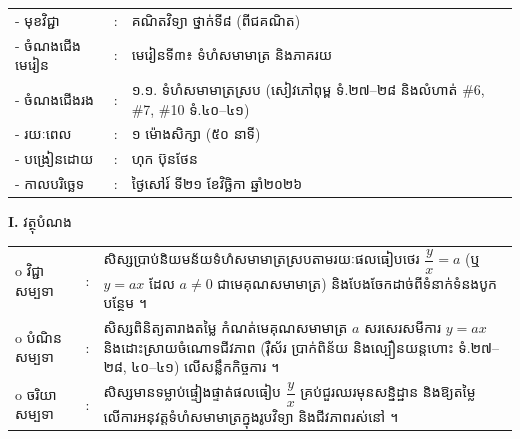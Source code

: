\documentclass[a4paper,10pt]{article}
\newcommand{\wcirc}{{\CourierBullet\fontsize{9.5pt}{11pt}\selectfont o}}
\begin{document}
{\renewcommand{\arraystretch}{0.98}
\hspace*{3.1cm}%
\begin{tabular}{@{}l l L{11.0cm}@{}}
  - \hspace{0.35cm} មុខវិជ្ជា & : & គណិតវិទ្យា ថ្នាក់ទី៨ (ពីជគណិត) \\
  - \hspace{0.35cm} ចំណងជើងមេរៀន & : & មេរៀនទី៣៖ ទំហំសមាមាត្រ និងភាគរយ \\
  - \hspace{0.35cm} ចំណងជើងរង & : & ១.១. ទំហំសមាមាត្រស្រប (សៀវភៅពុម្ព ទំ.២៧–២៨ និងលំហាត់ \#6, \#7, \#10 ទំ.៤០–៤១) \\
  - \hspace{0.35cm} រយៈពេល & : & ១ ម៉ោងសិក្សា (៥០ នាទី) \\
  - \hspace{0.35cm} បង្រៀនដោយ & : & ហុក ប៊ុនថែន \\
  - \hspace{0.35cm} កាលបរិច្ឆេទ & : & ថ្ងៃសៅរ៍ ទី២១ ខែវិច្ឆិកា ឆ្នាំ២០២៦ \\
\end{tabular}

\vspace{2pt}

\textbf{I.} {\muol វត្ថុបំណង}\\[1pt]
\hspace*{0.55cm}%
\begin{tabular}{@{}l l L{14.2cm}@{}}
  \wcirc \hspace{0.25cm} វិជ្ជាសម្បទា & : & សិស្សប្រាប់និយមន័យទំហំសមាមាត្រស្របតាមរយៈផលធៀបថេរ $\dfrac{y}{x} = a$ (ឬ $y = ax$ ដែល $a\neq 0$ ជាមេគុណសមាមាត្រ) និងបែងចែកដាច់ពីទំនាក់ទំនងបូកបន្ថែម ។ \\
  \wcirc \hspace{0.25cm} បំណិនសម្បទា & : & សិស្សពិនិត្យតារាងតម្លៃ កំណត់មេគុណសមាមាត្រ $a$ សរសេរសមីការ $y = ax$ និងដោះស្រាយចំណោទជីវភាព (រ៉ឺស័រ ប្រាក់ពិន័យ និងល្បឿនយន្តហោះ ទំ.២៧–២៨, ៤០–៤១) លើសន្លឹកកិច្ចការ ។ \\
  \wcirc \hspace{0.25cm} ចរិយាសម្បទា & : & សិស្សមានទម្លាប់ផ្ទៀងផ្ទាត់ផលធៀប $\dfrac{y}{x}$ គ្រប់ជួរឈរមុនសន្និដ្ឋាន និងឱ្យតម្លៃលើការអនុវត្តទំហំសមាមាត្រក្នុងរូបវិទ្យា និងជីវភាពរស់នៅ ។ \\
\end{tabular}

\vspace{2pt}

}
\end{document}
